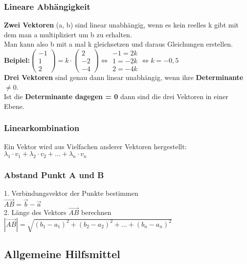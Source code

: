 \documentclass[6pt,a4paper]{scrartcl}
\newcommand{\abs}[1]{\ensuremath{\left\vert#1\right\vert}}
\begin{document}
\begin{multicols*}{3}
\subsubsection{Lineare Abhängigkeit}
\textbf{Zwei Vektoren} (a, b) sind linear unabhängig, wenn es kein reelles k gibt mit dem man a multipliziert um b zu erhalten.\\
Man kann also b mit a mal k gleichsetzen und daraus Gleichungen erstellen.\\
\textbf{Beipiel:}$\begin{pmatrix}-1\\1\\2\end{pmatrix}=k\cdot \begin{pmatrix}2\\-2\\-4\end{pmatrix} \Leftrightarrow \begin{matrix}-1 = 2k\\1 = -2k\\2 = -4k\end{matrix}\Leftrightarrow k=-0,5
$\\
\textbf{Drei Vektoren} sind genau dann linear unabhängig, wenn ihre \textbf{Determinante $\neq 0$}. 
\\
Ist die \textbf{Determinante dagegen = 0} dann sind die drei Vektoren in einer Ebene.
\subsubsection{Linearkombination}
Ein Vektor wird aus Vielfachen anderer Vektoren hergestellt:\\
${\lambda}_{1}\cdot v_1 + {\lambda}_{2}\cdot v_2 + ... + {\lambda}_{n} \cdot v_n$

\subsubsection{Abstand Punkt A und B}
1. Verbindungsvektor der Punkte bestimmen\\
$\overrightarrow{AB} = \overrightarrow{b} - \overrightarrow{a}$
\\
2. Länge des Vektors $\overrightarrow{AB}$ berechnen\\
$\abs{\overrightarrow{AB}} = \sqrt{(b_1-a_1)^2 + (b_2-a_2)^2 + ... + (b_n-a_n)^2}$\\
\subsection{Allgemeine Hilfsmittel}

\end{multicols*}
\end{document}
